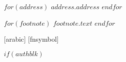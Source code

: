 

\makeatletter
\def\MyNewLabel#1#2#3{\expandafter\gdef\csname #1@#2\endcsname{#3}}

\def\MyRef#1#2{\@ifundefined{#1@#2}{???}{\csname #1@#2\endcsname}}

\newcommand*\ifcounter[1]{%
  \ifcsname c@#1\endcsname
    \expandafter\@firstoftwo
  \else
    \expandafter\@secondoftwo
  \fi
}
\makeatother

$for(address)$
\MyNewLabel{ADDRTXT}{$address.code$}{$address.address$}
$endfor$

$for(footnote)$
\MyNewLabel{ANOTETXT}{$footnote.code$}{$footnote.text$}
$endfor$

\usepackage{bigfoot}
[arabic] %
[fnsymbol]

$if(authblk)$ %
\usepackage{authblk}

\renewcommand\Authsep{, }
\renewcommand\Authand{, }
\renewcommand\Authands{, }


\makeatletter
\newcommand*\createaddrlblbycode[1]{%
  \ifcounter{ADDRLBL@#1}
    {}
    {\refstepcounter{addrcnt}\newcounter{ADDRLBL@#1}\setcounter{ADDRLBL@#1}{\value{addrcnt}}}%
}

\newcommand*\addrlblbycode[1]{\arabic{ADDRLBL@#1}}

\newcommand*\addrbycode[1]{%
  \ifcounter{ADDR@#1}
    {}
    {\newcounter{ADDR@#1}%
     \affil[\addrlblbycode{#1}]{\MyRef{ADDRTXT}{#1}}}%
}

\newcommand*\createanotelblbycode[1]{%
  \ifcounter{ANOTELBL@#1}
    {}
    {\refstepcounter{footnoteANote}\newcounter{ANOTELBL@#1}\setcounter{ANOTELBL@#1}{\value{footnoteANote}}}%
}

\newcommand*\anotelblbycode[1]{\fnsymbol{ANOTELBL@#1}}

\newcommand*\anotebycode[1]{%
  \ifcounter{ANOTE@#1}
    {}
    {\newcounter{ANOTE@#1}%
     \footnotetextANote[\value{ANOTELBL@#1}]{\MyRef{ANOTETXT}{#1}}}%
}
\makeatother

